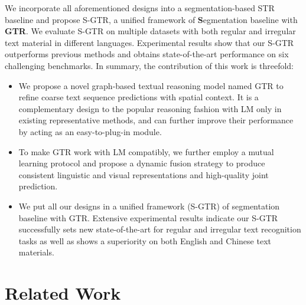 \documentclass[letterpaper]{article} \usepackage{aaai22}  \usepackage{times}  \usepackage{helvet}  \usepackage{courier}  \usepackage[hyphens]{url}  \usepackage{graphicx} \urlstyle{rm} \def\UrlFont{\rm}  \usepackage{natbib}  \usepackage{caption} \DeclareCaptionStyle{ruled}{labelfont=normalfont,labelsep=colon,strut=off} \frenchspacing  \setlength{\pdfpagewidth}{8.5in}  \setlength{\pdfpageheight}{11in}
\begin{document}
We incorporate all aforementioned designs into a segmentation-based STR baseline and propose S-GTR, a unified framework of \textbf{S}egmentation baseline with \textbf{GTR}. We evaluate S-GTR on multiple datasets with both regular and irregular text material in different languages. Experimental results show that our S-GTR outperforms previous methods and obtains state-of-the-art performance on six challenging benchmarks. In summary, the contribution of this work is 
threefold:


\begin{itemize}


\item We propose a novel graph-based textual reasoning model named GTR to refine coarse text sequence predictions with spatial context. It is a complementary design to the popular reasoning fashion with LM only in existing representative methods, and can further improve their performance by acting as an easy-to-plug-in module.


\item To make GTR work with LM compatibly, we further employ a mutual learning protocol and propose a dynamic fusion strategy to produce consistent linguistic and visual representations and high-quality joint prediction.


\item We put all our designs in a unified framework (S-GTR) of segmentation baseline with GTR. Extensive experimental results indicate our S-GTR successfully sets new state-of-the-art for regular and irregular text recognition tasks as well as shows a superiority on both English and Chinese text materials.




\end{itemize}


\section{Related Work}
\end{document}

